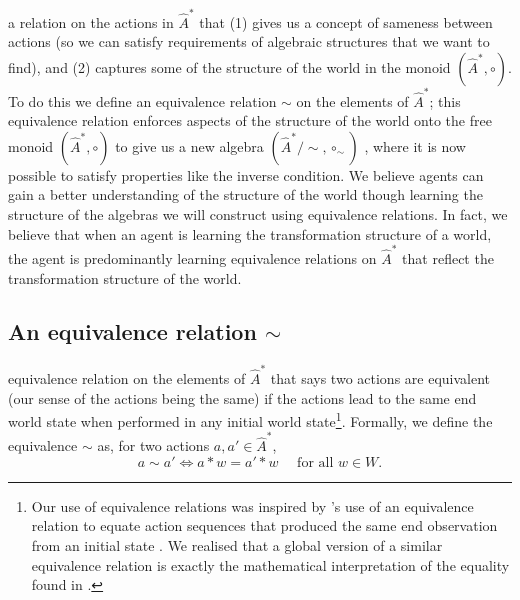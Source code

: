  a relation on the actions in $\hat{A}^{*}$ that (1) gives us a concept of sameness between actions (so we can satisfy requirements of algebraic structures that we want to find), and (2) captures some of the structure of the world in the monoid $(\hat{A}^{*}, \circ)$.
To do this we define an equivalence relation $\sim$ on the elements of $\hat{A}^{*}$; this equivalence relation enforces aspects of the structure of the world onto the free monoid $(\hat{A}^{*}, \circ)$ to give us a new algebra $(\hat{A}^{*}/\sim, \circ_{\sim})$ , where it is now possible to satisfy properties like the inverse condition.
We believe agents can gain a better understanding of the structure of the world though learning the structure of the algebras we will construct using equivalence relations.
In fact, we believe that when an agent is learning the transformation structure of a world, the agent is predominantly learning equivalence relations on $\hat{A}^{*}$ that reflect the transformation structure of the world.


\subsection{An equivalence relation $\sim$}

 equivalence relation on the elements of $\hat{A}^{*}$ that says two actions are equivalent (our sense of the actions being the same) if the actions lead to the same end world state when performed in any initial world state\footnote{
Our use of equivalence relations was inspired by \cite{caselles2020sensory}'s use of an equivalence relation to equate action sequences that produced the same end observation from an initial state .
We realised that a global version of a similar equivalence relation is exactly the mathematical interpretation of the equality found in \cite{Higgins2018}.
}.
Formally, we define the equivalence $\sim$ as, for two actions $a, a' \in \hat{A}^{*}$,
\begin{equation}
    a \sim a' \iff a \ast w = a' \ast w \quad \text{ for all $w \in W$}.
\end{equation}


